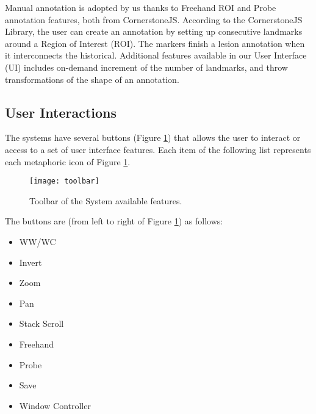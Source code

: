 Manual annotation is adopted by us thanks to Freehand ROI and Probe annotation features, both from CornerstoneJS. According to the CornerstoneJS Library, the user can create an annotation by setting up consecutive landmarks around a Region of Interest (ROI). The markers finish a lesion annotation when it interconnects the historical. Additional features available in our User Interface (UI) includes on-demand increment of the number of landmarks, and throw transformations of the shape of an annotation.

\clearpage


\subsection{User Interactions}

The systems have several buttons (Figure \ref{fig:toolbar}) that allows the user to interact or access to a set of user interface features. Each item of the following list represents each metaphoric icon of Figure \ref{fig:toolbar}.


\hfill

\begin{figure}[h]
\centering
\texttt{[image: toolbar]}
\caption{Toolbar of the System available features.}
\label{fig:toolbar}
\end{figure}

\hfill


\hfill

The buttons are (from left to right of Figure \ref{fig:toolbar}) as follows:

\hfill

\begin{itemize}
\item WW/WC
\item Invert
\item Zoom
\item Pan
\item Stack Scroll
\item Freehand
\item Probe
\item Save
\item Window Controller
\end{itemize}

